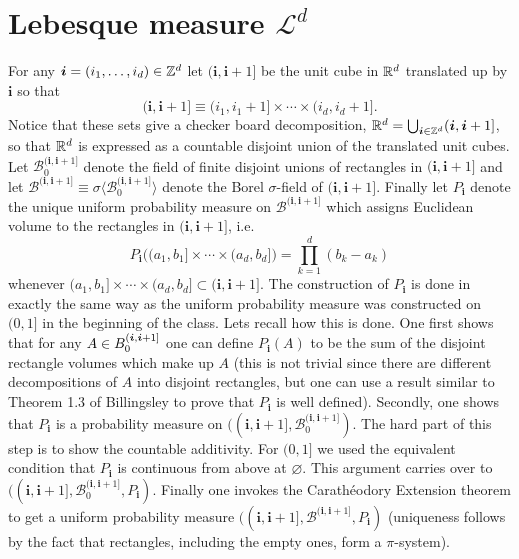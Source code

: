 \documentclass[10pt,letterpaper,twocolumn]{article}
\newcommand{\bs}{\boldsymbol}
\begin{document}


\section{Lebesque measure $\mathcal L^d$}


For any $\bs i=(i_1,\ldots, i_d)\in\Bbb Z^d$ let $(\bs i,\bs i+1]$ be the unit cube in $\Bbb R^d$ translated up by $\bs i$ so that
\[(\bs i,\bs i+1] \equiv (i_1, i_1+1]\times \cdots \times (i_d,i_d + 1].  \] 
Notice that these sets give a checker board decomposition, $\Bbb R^d=\bigcup_{\bs i\in\Bbb Z^d} (\bs i,\bs i+1] $, so that $\Bbb R^d$ is expressed as a countable disjoint union of the translated unit cubes. Let $\mathcal B_{0}^{(\bs i,\bs i+1] }$ denote the field of finite disjoint unions of rectangles in $(\bs i,\bs i+1] $ and let $\mathcal B^{(\bs i,\bs i+1] }\equiv \sigma \langle \mathcal B_{0}^{(\bs i,\bs i+1] }\rangle $ denote the Borel $\sigma$-field of  $(\bs i,\bs i+1]$. Finally let $P_{\bs i}$ denote the unique uniform probability measure on $\mathcal B^{(\bs i,\bs i+1] }$ which assigns Euclidean volume  to the rectangles in  $(\bs i,\bs i+1] $, i.e.
\[ P_{\bs i}\bigl( (a_1,b_1]\times \cdots \times (a_d,b_d]\bigr)=\prod_{k=1}^d (b_k - a_k) \]
whenever $(a_1,b_1]\times \cdots \times (a_d,b_d]\subset (\bs i,\bs i+1]$. The construction of $P_{\bs i}$ is done in exactly the same way as the uniform probability measure was constructed on $(0,1]$ in the beginning of the class. Lets recall how this is done. One first shows that for any $A\in \mathcal \mathcal B_{0}^{(\bs i,\bs i+1] }$ one can define $P_{\bs i}(A)$ to be the sum  of the disjoint rectangle volumes which make up $A$ (this is not trivial since there are different decompositions of $A$ into disjoint rectangles, but one can use a result similar to Theorem 1.3 of Billingsley to prove that $P_{\bs i}$ is well defined).  Secondly, one shows that $P_{\bs i}$ is a probability measure on $((\bs i, \bs i +1],\mathcal B_{0}^{(\bs i,\bs i+1] })$. The hard part of this step is to  show the countable additivity. For $(0,1]$ we used the equivalent condition that  $P_{\bs i}$ is continuous from above at $\varnothing$. This argument carries over to $((\bs i, \bs i +1],\mathcal B_{0}^{(\bs i,\bs i+1] }, P_{\bs i})$. Finally one invokes the Carath\'eodory Extension theorem to get a uniform probability measure $((\bs i, \bs i +1],\mathcal B^{(\bs i,\bs i+1] }, P_{\bs i})$ (uniqueness follows by the fact that rectangles, including the empty ones, form a $\pi$-system).
\end{document}
